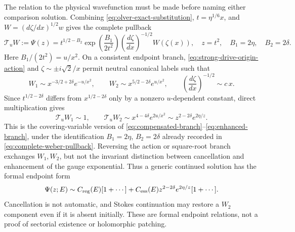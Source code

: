 \documentclass[11pt]{article}
\theoremstyle{remark}
\begin{document}
The relation to the physical wavefunction must be made before naming either
comparison solution.  Combining \eqref{eq:olver-exact-substitution},
\(t=\eta^{1/6}x\), and \(W=(d\zeta/dx)^{1/2}w\) gives the complete pullback
\begin{equation}
 \boxed{\mathcal T_uW:=\Psi(z)=
 t^{1/2-B_2}\exp\!\left(\frac{B_1}{2t^2}\right)
 \left(\frac{d\zeta}{dx}\right)^{-1/2}W(\zeta(x)),}
 \quad z=t^2,\quad B_1=2\eta,\quad B_2=2\delta.
 \label{eq:complete-weber-pullback}
\end{equation}
Here \(B_1/(2t^2)=u/x^2\).  On a consistent endpoint branch,
\eqref{eq:strong-drive-origin-action} and
\(\zeta\sim\pm i\sqrt2/x\) permit neutral canonical labels such that
\begin{equation}
 W_1\sim x^{-3/2+2\delta}e^{-u/x^2},\qquad
 W_2\sim x^{5/2-2\delta}e^{u/x^2},\qquad
 \left(\frac{d\zeta}{dx}\right)^{-1/2}\sim c\,x .
 \label{eq:neutral-weber-origin-pair}
\end{equation}
Since \(t^{1/2-2\delta}\) differs from \(x^{1/2-2\delta}\) only by a
nonzero \(u\)-dependent constant, direct multiplication gives
\begin{equation}
 \mathcal T_uW_1\sim1,\qquad
 \mathcal T_uW_2\sim x^{4-4\delta}e^{2u/x^2}
 \sim z^{2-2\delta}e^{2\eta/z}.
 \label{eq:weber-cancellation-enhancement}
\end{equation}
This is the covering-variable version of
\eqref{eq:compensated-branch}--\eqref{eq:enhanced-branch}, under the
identification \(B_1=2\eta\), \(B_2=2\delta\) already recorded in
\eqref{eq:complete-weber-pullback}.  Reversing the action or
square-root branch exchanges \(W_1,W_2\), but not the invariant distinction
between cancellation and enhancement of the gauge exponential.  Thus a
generic continued solution has the formal endpoint form
\begin{equation}
 \Psi(z;E)\sim C_{\rm reg}(E)[1+\cdots]+C_{\rm ess}(E)
 z^{2-2\delta}e^{2\eta/z}[1+\cdots].
 \label{eq:essential-endpoint-coefficient}
\end{equation}
Cancellation is not automatic, and Stokes continuation may restore a
\(W_2\) component even if it is absent initially.  These are formal endpoint
relations, not a proof of sectorial existence or holomorphic patching.
\end{document}

